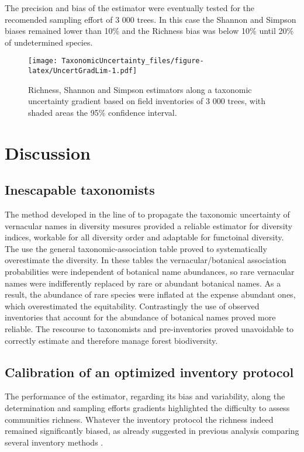\documentclass[fleqn,10pt]{ArtEcoFoG} %
\begin{document}
The precision and bias of the estimator were eventually tested for the
recomended sampling effort of 3 000 trees. In this case the Shannon and
Simpson biases remained lower than 10\% and the Richness bias was below
10\% until 20\% of undetermined species.

\begin{figure}
\centering
\texttt{[image: TaxonomicUncertainty\_files/figure-latex/UncertGradLim-1.pdf]}
\caption{\label{fig:UncertGradLim}Richness, Shannon and Simpson estimators
along a taxonomic uncertainty gradient based on field inventories of 3
000 trees, with shaded areas the 95\% confidence interval.}
\end{figure}

\section{Discussion}\label{discussion}

\subsection{Inescapable taxonomists}\label{inescapable-taxonomists}

The method developed in the line of \citet{Guitet2014b} to propagate the
taxonomic uncertainty of vernacular names in diversity mesures provided
a reliable estimator for diversity indices, workable for all diversity
order and adaptable for functoinal diversity. The use the general
taxonomic-association table proved to systematically overestimate the
diversity. In these tables the vernacular/botanical association
probabilities were independent of botanical name abundances, so rare
vernacular names were indifferently replaced by rare or abundant
botanical names. As a result, the abundance of rare species were
inflated at the expense abundant ones, which overestimated the
equitability. Contrastingly the use of observed inventories that account
for the abundance of botanical names proved more reliable. The rescourse
to taxonomists and pre-inventories proved unavoidable to correctly
estimate and therefore manage forest biodiversity.

\subsection{Calibration of an optimized inventory
protocol}\label{calibration-of-an-optimized-inventory-protocol}

The performance of the estimator, regarding its bias and variability,
along the determination and sampling efforts gradients highlighted the
difficulty to assess communities richness. Whatever the inventory
protocol the richness indeed remained significantly biased, as already
suggested in previous analysis comparing several inventory methods
\citep{Higgins2004}.
\end{document}
